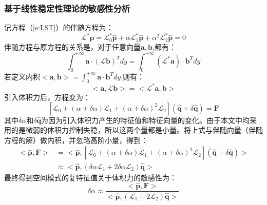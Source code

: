 \subsubsection{基于线性稳定性理论的敏感性分析}
记方程（\ref{e:LST}）的伴随方程为：
\begin{equation}\label{e:aLST}
  \mathscr{L}^*\hat{\mathbf{p}}=\mathscr{L}_0^*\hat{\mathbf{p}}+\alpha \mathscr{L}_1^*\hat{\mathbf{p}} + \alpha^2\mathscr{L}_2^*\hat{\mathbf{p}}=0
\end{equation}
伴随方程与原方程的关系是，对于任意向量$\mathbf{a},\mathbf{b}$,都有：
\begin{equation}
    \int_{0}^{+\infty}\mathbf{a}\cdot(\mathscr{L}\mathbf{b})^Tdy=\int_{0}^{+\infty}(\mathscr{L}^*\mathbf{a})\cdot\mathbf{b}^Tdy
\end{equation}
若定义内积$<\mathbf{a},\mathbf{b}>=\int_{0}^{+\infty}\mathbf{a}\cdot\mathbf{b}^Tdy$,则有：
\begin{equation}
  <\mathbf{a},\mathscr{L}\mathbf{b}> = <\mathscr{L}^*\mathbf{a},\mathbf{b}>
\end{equation}
引入体积力后，方程变为：
\begin{equation}\label{}
  \left[\mathscr{L}_0+(\alpha + \delta\alpha) \mathscr{L}_1 + (\alpha + \delta\alpha)^2\mathscr{L}_2\right](\hat{\mathbf{q}}+\delta\hat{\mathbf{q}})=\mathbf{F}
\end{equation}
其中$\delta\alpha$和$\delta\hat{\mathbf{q}}$为因为引入体积力产生的特征值和特征向量的变化。由于本文中均采用的是微弱的体积力控制失稳，所以这两个量都是小量。将上式与伴随向量（伴随方程的解）做内积，并忽略高阶小量，得到：
\begin{equation}\label{}
  \begin{aligned}
    <\hat{\mathbf{p}},\mathbf{F}> &= <\hat{\mathbf{p}},\left[\mathscr{L}_0+(\alpha + \delta\alpha) \mathscr{L}_1 + (\alpha + \delta\alpha)^2\mathscr{L}_2\right](\hat{\mathbf{q}}+\delta\hat{\mathbf{q}})> \\
    &\approx  <\hat{\mathbf{p}},(\delta\alpha \mathscr{L}_1+2\delta\alpha\mathscr{L}_2)\hat{\mathbf{q}}>
  \end{aligned}
\end{equation}
最终得到空间模式的复特征值关于体积力的敏感性为：
\begin{equation}\label{e:LST_adjoint}
  \delta\alpha \approx \frac{<\hat{\mathbf{p}},\mathbf{F}>}{<\hat{\mathbf{p}},( \mathscr{L}_1+2\mathscr{L}_2)\hat{\mathbf{q}}>}
\end{equation}
